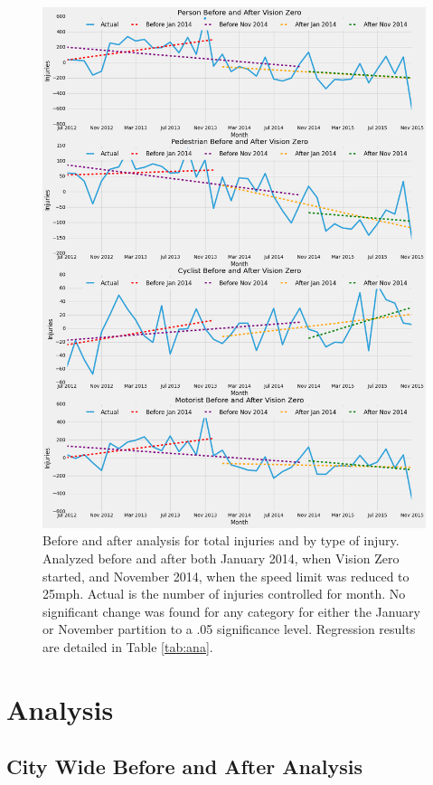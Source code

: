 \documentclass[10pt,journal,compsoc]{IEEEtran}
\begin{document}
\begin{figure}[p]
	\centering
	\includegraphics[width=\textwidth]{fig2.png}
	\caption{Before and after analysis for total injuries and by type of injury.  Analyzed before and after both January 2014, when Vision Zero started, and November 2014, when the speed limit was reduced to 25mph.  Actual is the number of injuries controlled for month.  No significant change was found for any category for either the January or November partition to a .05 significance level.  Regression results are detailed in Table \ref{tab:ana}.}\label{fig:injuryana}
\end{figure}

\section{Analysis}
\subsection{City Wide Before and After Analysis}
\end{document}
